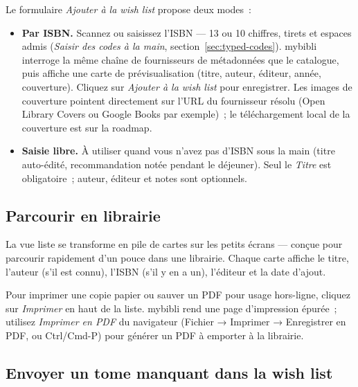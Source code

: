 Le formulaire \emph{Ajouter à la wish list} propose deux modes~:

\begin{itemize}
  \item \textbf{Par ISBN.} Scannez ou saisissez l'ISBN --- 13 ou 10
        chiffres, tirets et espaces admis
        (\emph{Saisir des codes à la main},
        section~\ref{sec:typed-codes}). mybibli interroge la même chaîne de fournisseurs
        de métadonnées que le catalogue, puis affiche une carte de
        prévisualisation (titre, auteur, éditeur, année,
        couverture). Cliquez sur \emph{Ajouter à la wish list}
        pour enregistrer. Les images de couverture pointent
        directement sur l'URL du fournisseur résolu (Open Library
        Covers ou Google Books par exemple)~; le téléchargement
        local de la couverture est sur la roadmap.
  \item \textbf{Saisie libre.} À utiliser quand vous n'avez pas
        d'ISBN sous la main (titre auto-édité, recommandation
        notée pendant le déjeuner). Seul le \emph{Titre} est
        obligatoire~; auteur, éditeur et notes sont optionnels.
\end{itemize}

\subsection{Parcourir en librairie}

La vue liste se transforme en pile de cartes sur les petits
écrans \string— conçue pour parcourir rapidement d'un pouce dans
une librairie. Chaque carte affiche le titre, l'auteur (s'il est
connu), l'ISBN (s'il y en a un), l'éditeur et la date d'ajout.

Pour imprimer une copie papier ou sauver un PDF pour usage
hors-ligne, cliquez sur \emph{Imprimer} en haut de la liste.
mybibli rend une page d'impression épurée~; utilisez \emph{Imprimer
en PDF} du navigateur (Fichier \string→ Imprimer \string→
Enregistrer en PDF, ou Ctrl/Cmd-P) pour générer un PDF à
emporter à la librairie.

\subsection{Envoyer un tome manquant dans la wish list}
\label{sec:wishlist-gap}

